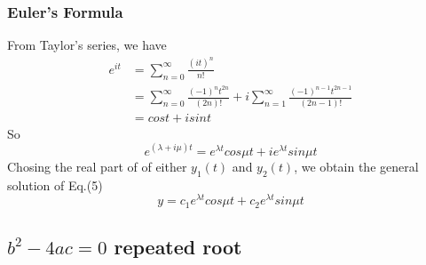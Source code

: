 \documentclass{article}
\begin{document}
\subsubsection*{Euler's Formula}
From Taylor's series, we have
\begin{align*}
e^{it} &= \sum_{n=0}^{\infty}\frac{(it)^n}{n!}\\
	   &= \sum_{n=0}^{\infty}\frac{(-1)^nt^{2n}}{(2n)!} + i\sum_{n=1}^{\infty}\frac{(-1)^{n-1}t^{2n-1}}{(2n-1)!}\\
	   &= cost+i sint
\end{align*}
So 
\begin{equation}
	e^{(\lambda+i\mu)t} = e^{\lambda t}cos\mu t+ie^{\lambda t}sin\mu t
\end{equation}
Chosing the real part of of either $y_1(t)$ and $y_2(t)$, we obtain the general solution of Eq.(5)
\begin{equation}
	y = c_1e^{\lambda t}cos\mu t + c_2e^{\lambda t}sin\mu t
\end{equation}

\subsection{$b^2 - 4ac = 0$ repeated root}
\end{document}
